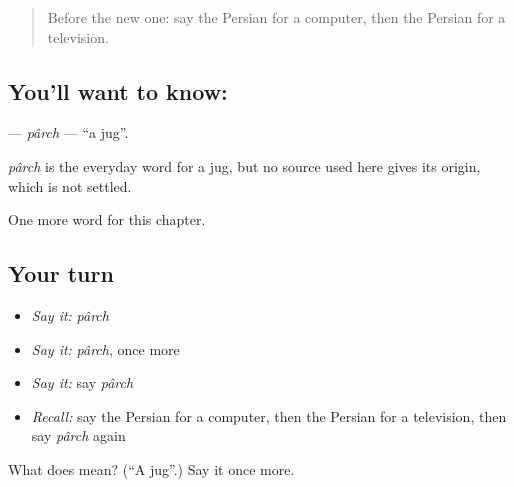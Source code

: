 \label{lesson:FA-C110-parch}



\begin{quote}
Before the new one: say the Persian for a computer, then the Persian for a television.
\end{quote}

\subsection*{You'll want to know: }
\textbf{} — \emph{pârch} — \textquotedblleft{}a jug\textquotedblright{}.

\begin{cousinweb}
\emph{pârch} is the everyday word for a jug, but no source used here gives its origin, which is not settled.
\end{cousinweb}

\begin{grammarlens}[title={What you've built}]
One more word for this chapter.
\end{grammarlens}

\subsection*{Your turn}
\begin{itemize}
\raggedright
  \item \emph{Say it:} \emph{pârch}
  \item \emph{Say it:} \emph{pârch}, once more
  \item \emph{Say it:} say \emph{pârch}
  \item \emph{Recall:} say the Persian for a computer, then the Persian for a television, then say \emph{pârch} again
\end{itemize}

\begin{tcolorbox}[breakable,colback=teal!4,colframe=teal!35!black,title={Before you move on}]
What does  mean? (\textquotedblleft{}A jug\textquotedblright{}.) Say it once more.
\end{tcolorbox}
